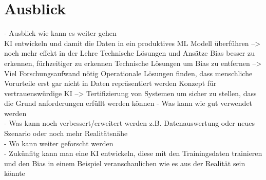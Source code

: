 \section{Ausblick}
\label{ausblick}
- Ausblick wie kann es weiter gehen\\
    KI entwickeln und damit die Daten in ein produktives ML Modell überführen --> noch mehr effekt in der Lehre
    Technische Lösungen und Ansätze Bias besser zu erkennen, fürhzeitiger zu erkennen 
    Technische Lösungen um Bias zu entfernen --> Viel Forschungsaufwand nötig
    Operationale Lösungen finden, dass menschliche Vorurteile erst gar nicht in Daten repräsentiert werden 
    Konzept für vertrauenswürdige KI --> Tertifizierung von Systemen um sicher zu stellen, dass die Grund anforderungen erfüllt werden können
- Was kann wie gut verwendet werden\\
- Was kann noch verbessert/erweitert werden z.B. Datenauswertung oder neues Szenario oder noch mehr Realitätsnähe\\
- Wo kann weiter geforscht werden\\

- Zukünfitg kann man eine KI entwickeln, diese mit den Trainingsdaten trainieren und den Bias in einem Beispiel veranschaulichen wie es aus der Realität sein könnte

\newpage